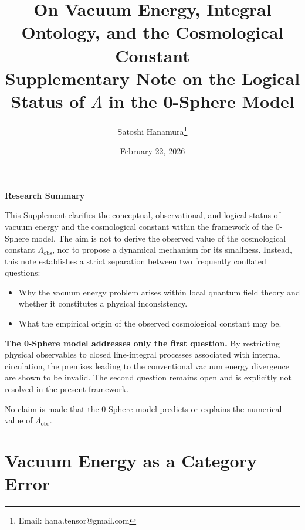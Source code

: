\documentclass[12pt,letterpaper]{article}
\begin{document}
\title{On Vacuum Energy, Integral Ontology, and the Cosmological Constant\\
\normalsize Supplementary Note on the Logical Status of $\Lambda$ in the 0-Sphere Model}

\author{Satoshi Hanamura\thanks{Email: hana.tensor@gmail.com}}
\date{February 22, 2026}

\maketitle

\tableofcontents



\begin{center}
\textbf{Research Summary}
\end{center}

\justifying

This Supplement clarifies the conceptual, observational, and logical status of vacuum energy and the cosmological constant within the framework of the 0-Sphere model. The aim is not to derive the observed value of the cosmological constant $\Lambda_{\mathrm{obs}}$, nor to propose a dynamical mechanism for its smallness. Instead, this note establishes a strict separation between two frequently conflated questions:

\begin{itemize}
\item[(i)] Why the vacuum energy problem arises within local quantum field theory and whether it constitutes a physical inconsistency.
\item[(ii)] What the empirical origin of the observed cosmological constant may be.
\end{itemize}

\textbf{The 0-Sphere model addresses only the first question.} By restricting physical observables to closed line-integral processes associated with internal circulation, the premises leading to the conventional vacuum energy divergence are shown to be invalid. The second question remains open and is explicitly not resolved in the present framework.

No claim is made that the 0-Sphere model predicts or explains the numerical value of $\Lambda_{\mathrm{obs}}$.


\section{Vacuum Energy as a Category Error}
\end{document}
